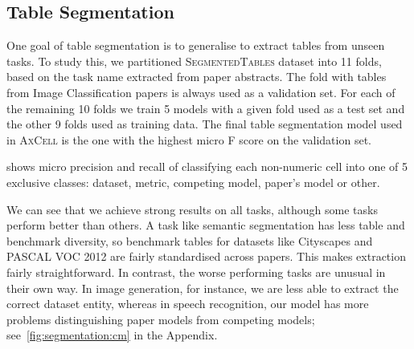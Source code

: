 \documentclass[11pt,a4paper]{article}
\newcommand{\model}{\textsc{AxCell}}
\newcommand{\finegrained}{\textsc{SegmentedTables}}
\begin{document}
\subsection{Table Segmentation}
\label{sec:results:structure-prediction}

One goal of table segmentation is to generalise to extract tables from unseen tasks. To study this, we partitioned \finegrained{} dataset into 11 folds, based on the task name extracted from paper abstracts. The fold with tables from Image Classification papers is always used as a validation set. For each of the remaining 10 folds we train 5 models with a given fold used as a test set and the other 9 folds used as training data. The final table segmentation model used in \model{} is the one with the highest micro F score on the validation set.

 shows micro precision and recall of classifying each non-numeric cell into one of 5 exclusive classes: dataset, metric, competing model, paper’s model or other.

We can see that we achieve strong results on all tasks, although some tasks perform better than others. A task like semantic segmentation has less table and benchmark diversity, so benchmark tables for datasets like Cityscapes and PASCAL VOC 2012 are fairly standardised across papers. This makes extraction fairly straightforward. In contrast, the worse performing tasks are unusual in their own way. In image generation, for instance, we are less able to extract the correct dataset entity, whereas in speech recognition, our model has more problems distinguishing paper models from competing models; see~\cref{fig:segmentation:cm} in the Appendix.
\end{document}
